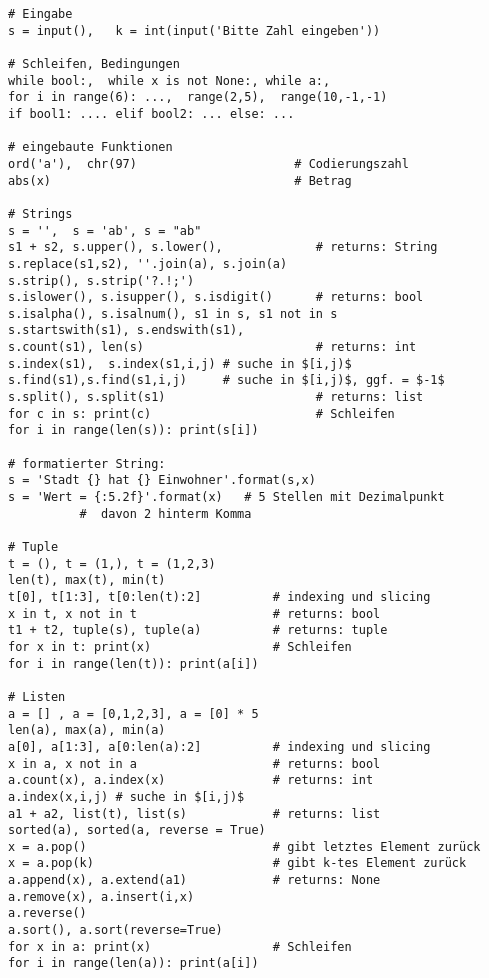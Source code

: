 \documentclass[a4paper,11pt,landscape,twocolumn]{book}
\begin{document}
\parskip 4pt
\thispagestyle{ErsteSeite}
\footnotesize
\lstset{tabsize=4, basicstyle=\footnotesize, showstringspaces=false,mathescape=true}


\begin{lstlisting}
# Eingabe
s = input(),   k = int(input('Bitte Zahl eingeben'))

# Schleifen, Bedingungen
while bool:,  while x is not None:, while a:,
for i in range(6): ...,  range(2,5),  range(10,-1,-1)
if bool1: .... elif bool2: ... else: ...

# eingebaute Funktionen
ord('a'),  chr(97)                      # Codierungszahl
abs(x)                                  # Betrag

# Strings 
s = '',  s = 'ab', s = "ab"
s1 + s2, s.upper(), s.lower(),             # returns: String  
s.replace(s1,s2), ''.join(a), s.join(a)   
s.strip(), s.strip('?.!;')   
s.islower(), s.isupper(), s.isdigit()      # returns: bool  
s.isalpha(), s.isalnum(), s1 in s, s1 not in s
s.startswith(s1), s.endswith(s1),
s.count(s1), len(s)                        # returns: int
s.index(s1),  s.index(s1,i,j) # suche in $[i,j)$
s.find(s1),s.find(s1,i,j)     # suche in $[i,j)$, ggf. = $-1$
s.split(), s.split(s1)                     # returns: list
for c in s: print(c)                       # Schleifen
for i in range(len(s)): print(s[i])

# formatierter String:
s = 'Stadt {} hat {} Einwohner'.format(s,x)
s = 'Wert = {:5.2f}'.format(x)   # 5 Stellen mit Dezimalpunkt
          #  davon 2 hinterm Komma

# Tuple
t = (), t = (1,), t = (1,2,3)
len(t), max(t), min(t)   
t[0], t[1:3], t[0:len(t):2]          # indexing und slicing
x in t, x not in t                   # returns: bool
t1 + t2, tuple(s), tuple(a)          # returns: tuple     
for x in t: print(x)                 # Schleifen
for i in range(len(t)): print(a[i])  

# Listen
a = [] , a = [0,1,2,3], a = [0] * 5
len(a), max(a), min(a)   
a[0], a[1:3], a[0:len(a):2]          # indexing und slicing
x in a, x not in a                   # returns: bool 
a.count(x), a.index(x)               # returns: int
a.index(x,i,j) # suche in $[i,j)$
a1 + a2, list(t), list(s)            # returns: list
sorted(a), sorted(a, reverse = True)
x = a.pop()                          # gibt letztes Element zurück
x = a.pop(k)                         # gibt k-tes Element zurück
a.append(x), a.extend(a1)            # returns: None
a.remove(x), a.insert(i,x) 
a.reverse()
a.sort(), a.sort(reverse=True)
for x in a: print(x)                 # Schleifen
for i in range(len(a)): print(a[i])


\end{lstlisting}
\end{document}
